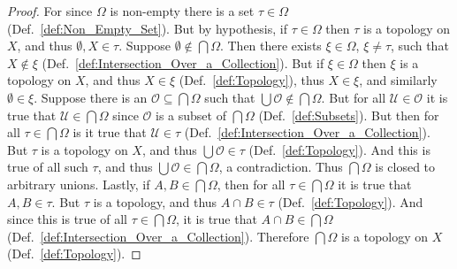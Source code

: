     \begin{proof}
        For since $\Omega$ is non-empty there is a set $\tau\in\Omega$
        (Def.~\ref{def:Non_Empty_Set}). But by hypothesis, if $\tau\in\Omega$
        then $\tau$ is a topology on $X$, and thus $\emptyset,X\in\tau$.
        Suppose $\emptyset\notin\bigcap\Omega$. Then there exists
        $\xi\in\Omega$, $\xi\ne\tau$, such that $X\notin\xi$
        (Def.~\ref{def:Intersection_Over_a_Collection}). But if $\xi\in\Omega$
        then $\xi$ is a topology on $X$, and thus $X\in\xi$
        (Def.~\ref{def:Topology}), thus $X\in\xi$, and similarly
        $\emptyset\in\xi$. Suppose there is an
        $\mathcal{O}\subseteq\bigcap\Omega$ such that
        $\bigcup\mathcal{O}\notin\bigcap\Omega$. But for all
        $\mathcal{U}\in\mathcal{O}$ it is true that
        $\mathcal{U}\in\bigcap\Omega$ since $\mathcal{O}$ is a subset of
        $\bigcap\Omega$ (Def.~\ref{def:Subsets}). But then for all
        $\tau\in\bigcap\Omega$ is it true that $\mathcal{U}\in\tau$
        (Def.~\ref{def:Intersection_Over_a_Collection}). But $\tau$ is a
        topology on $X$, and thus $\bigcup\mathcal{O}\in\tau$
        (Def.~\ref{def:Topology}). And this is true of all such $\tau$, and thus
        $\bigcup\mathcal{O}\in\bigcap\Omega$, a contradiction. Thus
        $\bigcap\Omega$ is closed to arbitrary unions. Lastly, if
        $A,B\in\bigcap\Omega$, then for all $\tau\in\bigcap\Omega$ it is true
        that $A,B\in\tau$. But $\tau$ is a topology, and thus
        $A\cap{B}\in\tau$ (Def.~\ref{def:Topology}). And since this is true of
        all $\tau\in\bigcap\Omega$, it is true that $A\cap{B}\in\bigcap\Omega$
        (Def.~\ref{def:Intersection_Over_a_Collection}). Therefore
        $\bigcap\Omega$ is a topology on $X$ (Def.~\ref{def:Topology}).
    \end{proof}
